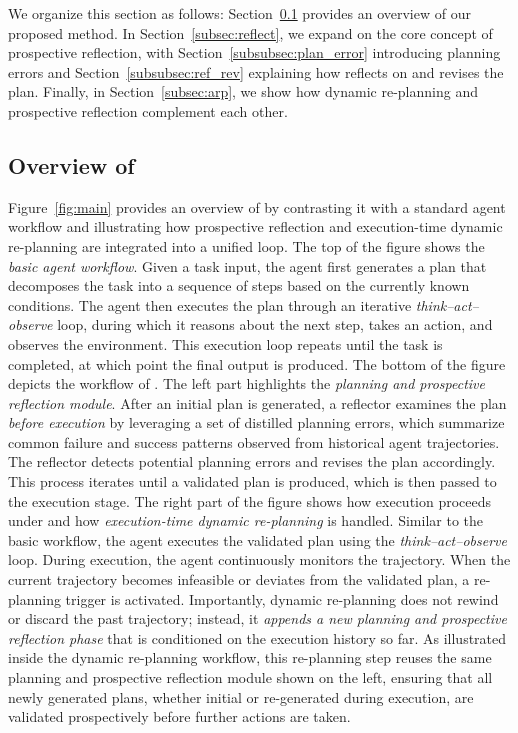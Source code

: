 

We organize this section as follows: Section~\ref{subsec:overview} provides an overview of our proposed method. In Section~\ref{subsec:reflect}, we expand on the core concept of prospective reflection, with Section~\ref{subsubsec:plan_error} introducing planning errors and Section~\ref {subsubsec:ref_rev} explaining how \method reflects on and revises the plan. Finally, in Section~\ref{subsec:arp}, we show how dynamic re-planning and prospective reflection complement each other.

\subsection{Overview of \method}
\label{subsec:overview}

Figure~\ref{fig:main} provides an overview of \method by contrasting it with a standard agent workflow and illustrating how prospective reflection and execution-time dynamic re-planning are integrated into a unified loop.
The top of the figure shows the \emph{basic agent workflow}. Given a task input, the agent first generates a plan that decomposes the task into a sequence of steps based on the currently known conditions. The agent then executes the plan through an iterative \textit{think--act--observe} loop, during which it reasons about the next step, takes an action, and observes the environment. This execution loop repeats until the task is completed, at which point the final output is produced.
The bottom of the figure depicts the workflow of \method. The left part highlights the \emph{planning and prospective reflection module}. After an initial plan is generated, a reflector examines the plan \emph{before execution} by leveraging a set of distilled planning errors, which summarize common failure and success patterns observed from historical agent trajectories. The reflector detects potential planning errors and revises the plan accordingly. This process iterates until a validated plan is produced, which is then passed to the execution stage.
The right part of the figure shows how execution proceeds under \method and how \emph{execution-time dynamic re-planning} is handled. Similar to the basic workflow, the agent executes the validated plan using the \textit{think--act--observe} loop. During execution, the agent continuously monitors the trajectory. When the current trajectory becomes infeasible or deviates from the validated plan, a re-planning trigger is activated. Importantly, dynamic re-planning does not rewind or discard the past trajectory; instead, it \emph{appends a new planning and prospective reflection phase} that is conditioned on the execution history so far. As illustrated inside the dynamic re-planning workflow, this re-planning step reuses the same planning and prospective reflection module shown on the left, ensuring that all newly generated plans, whether initial or re-generated during execution, are validated prospectively before further actions are taken.

